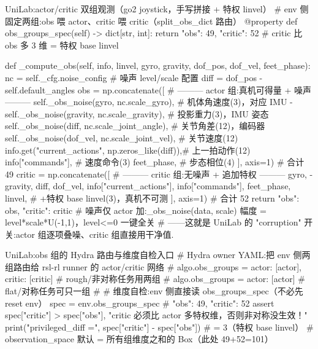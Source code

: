 \begin{codebox}[Python]{UniLab:actor/critic 双组观测（go2 joystick，手写拼接 + 特权 linvel）}
# env 侧固定两组:obs 喂 actor、critic 喂 critic（split_obs_dict 路由）
@property
def obs_groups_spec(self) -> dict[str, int]:
    return {"obs": 49, "critic": 52}          # critic 比 obs 多 3 维 = 特权 base linvel

def _compute_obs(self, info, linvel, gyro, gravity, dof_pos, dof_vel, feet_phase):
    nc   = self._cfg.noise_config              # 噪声 level/scale 配置
    diff = dof_pos - self.default_angles
    obs = np.concatenate([                     # ——— actor 组:真机可得量 + 噪声 ———
        self._obs_noise(gyro,    nc.scale_gyro),         # 机体角速度(3)，对应 IMU
        -self._obs_noise(gravity, nc.scale_gravity),     # 投影重力(3)，IMU 姿态
        self._obs_noise(diff,    nc.scale_joint_angle),  # 关节角差(12)，编码器
        self._obs_noise(dof_vel, nc.scale_joint_vel),    # 关节速度(12)
        info.get("current_actions", np.zeros_like(diff)),# 上一拍动作(12)
        info["commands"],                                # 速度命令(3)
        feet_phase,                                      # 步态相位(4)
    ], axis=1)                                           # 合计 49
    critic = np.concatenate([                  # ——— critic 组:无噪声 + 追加特权 ———
        gyro, -gravity, diff, dof_vel, info["current_actions"],
        info["commands"], feet_phase,
        linvel,                                          # +特权 base linvel(3)，真机不可测
    ], axis=1)                                           # 合计 52
    return {"obs": obs, "critic": critic}
# 噪声仅 actor 加:_obs_noise(data, scale) 幅度 = level*scale*U(-1,1)，level<=0 一键全关
#   ——这就是 UniLab 的 "corruption" 开关:actor 组逐项叠噪、critic 组直接用干净值.
\end{codebox}

\begin{codebox}[Python]{UniLab:obs 组的 Hydra 路由与维度自检入口}
# Hydra owner YAML:把 env 侧两组路由给 rsl-rl runner 的 actor/critic 网络
# algo.obs_groups = {actor: [actor], critic: [critic]}   # rough/非对称任务用两组
# algo.obs_groups = {actor: [actor]}                     # flat/对称任务可只一组
#
# 维度自检:env 侧直接读 obs_groups_spec（不必先 reset env）
spec = env.obs_groups_spec                  # {"obs": 49, "critic": 52}
assert spec["critic"] > spec["obs"], "critic 必须比 actor 多特权维，否则非对称没生效！"
print("privileged_diff =", spec["critic"] - spec["obs"])   # = 3（特权 base linvel）
# observation_space 默认 = 所有组维度之和的 Box（此处 49+52=101）
\end{codebox}

